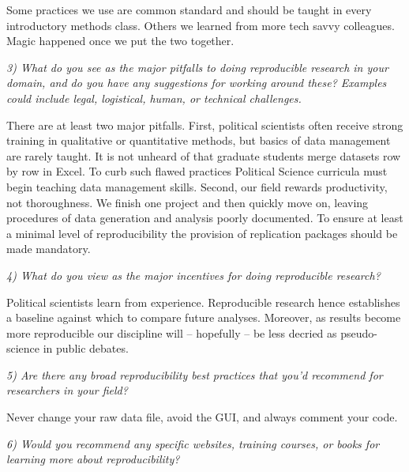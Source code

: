 \documentclass[
  11pt
]{article}
\begin{document}
Some practices we use are common standard and should be
taught in every introductory methods class. Others we learned
from more tech savvy colleagues. Magic happened once we put
the two together.

\textit{3) What do you see as the major pitfalls to doing reproducible research in your domain, and do you have any suggestions for working around these? Examples could include legal, logistical, human, or technical challenges.}

There are at least two major pitfalls. First, political
scientists often receive strong training in qualitative or 
quantitative methods, but basics of data management are
rarely taught. It is not unheard of that graduate students
merge datasets row by row in Excel. To curb such flawed practices 
Political Science curricula must begin teaching data
management skills. Second, our field rewards productivity,
not thoroughness. We finish one project and then quickly
move on, leaving procedures of data generation and analysis
poorly documented. To ensure at least a minimal level of
reproducibility the provision of replication packages should
be made mandatory. 

\textit{4) What do you view as the major incentives for doing reproducible research?}

Political scientists learn from experience. Reproducible
research hence establishes a baseline against which to
compare future analyses. Moreover, as results become more reproducible our discipline will -- hopefully -- be less
decried as pseudo-science in public debates. 

\textit{5) Are there any broad reproducibility best practices that you'd recommend for researchers in your field?}

Never change your raw data file, avoid the GUI, and always
comment your code.

\textit{6) Would you recommend any specific websites, training courses, or books for learning more about reproducibility?}

\clearpage



\end{document}
